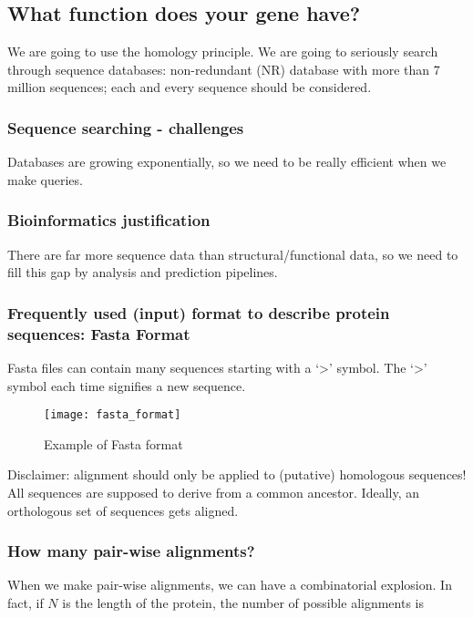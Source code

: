 \subsection{What function does your gene have?}

We are going to use the homology principle. We are going to seriously search
through sequence databases: non-redundant (NR) database with more than 7 million
sequences; each and every sequence should be considered.

\subsubsection{Sequence searching - challenges}

Databases are growing exponentially, so we need to be really efficient when we
make queries.

\subsubsection{Bioinformatics justification}

There are far more sequence data than structural/functional data, so we need to
fill this gap by analysis and prediction pipelines.

\subsubsection{Frequently used (input) format to describe protein sequences: Fasta Format}

Fasta files can contain many sequences starting with a `>' symbol. The `>' symbol
each time signifies a new sequence.

\begin{figure}[!htpb]
\centering
\texttt{[image: fasta\_format]}
\caption{Example of Fasta format}
\label{Example of Fasta format}
\end{figure}

Disclaimer: alignment should only be applied to (putative) homologous sequences!
All sequences are supposed to derive from a common ancestor. Ideally, an
orthologous set of sequences gets aligned.

\subsubsection{How many pair-wise alignments?}

When we make pair-wise alignments, we can have a combinatorial explosion. In fact,
if $N$ is the length of the protein, the number of possible alignments is


